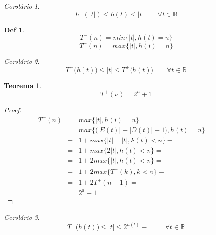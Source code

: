 \documentclass[a4paper,11pt]{article}
\theoremstyle{definition} \newtheorem{definicao}{Def}
\theoremstyle{definition} \newtheorem{exemplo}{Exemplo}
\theoremstyle{plain}      \newtheorem{teorema}{Teorema}
\theoremstyle{remark}     \newtheorem*{corolario}{Corol\'{a}rio}
\begin{document}
\begin{corolario}
\begin{equation*}
h^{-}(|t|) \leq h(t) \leq |t| \qquad
\forall t \in \mathbb{B}
\end{equation*}
\end{corolario}

\begin{definicao}
\begin{equation*}
T^{-}(n) = min\{|t|, h(t) = n\}
\end{equation*}
\begin{equation*}
T^{+}(n) = max\{|t|, h(t) = n\}
\end{equation*}
\end{definicao}

\begin{corolario}
\begin{equation*}
T^{-}\Big(h(t)\Big) \leq |t| \leq T^{+}\Big(h(t)\Big) \qquad
\forall t \in \mathbb{B}
\end{equation*}
\end{corolario}

\begin{teorema}
\begin{equation*}
T^{+}(n) = 2^n + 1
\end{equation*}
\end{teorema}

\begin{proof}
\begin{eqnarray*}
T^{+}(n) & = & max\{|t|, h(t) = n\} \\
& = & max\bigg\{\Big(|E(t)| + |D(t)| + 1 \Big), h(t) = n \bigg\} = \\
& = & 1 + max\{|t| + |t|, h(t) < n \} = \\
& = & 1 + max\{2|t|, h(t) < n \} = \\
& = & 1 + 2max\{|t|, h(t) < n \} = \\
& = & 1 + 2max\{T^{+}(k), k < n\} = \\
& = & 1 + 2T^{+}(n - 1) = \\
& = & 2^n - 1
\end{eqnarray*}
\end{proof}

\begin{corolario}
\begin{equation*}
T^{-}\Big(h(t)\Big) \leq |t| \leq 2^{h(t)} - 1 \qquad
\forall t \in \mathbb{B}
\end{equation*}
\end{corolario}
\end{document}

